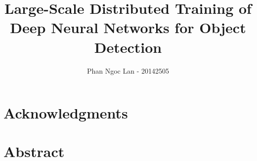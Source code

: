 \documentclass[fontsize=12pt]{scrartcl}
\title{Large-Scale Distributed Training of Deep Neural Networks for Object Detection}
\author{Phan Ngoc Lan - 20142505}
\begin{document}
\maketitle
\pagebreak

\section*{Acknowledgments}

\pagebreak

\section*{Abstract}

\pagebreak

\tableofcontents
\pagebreak








\end{document}
